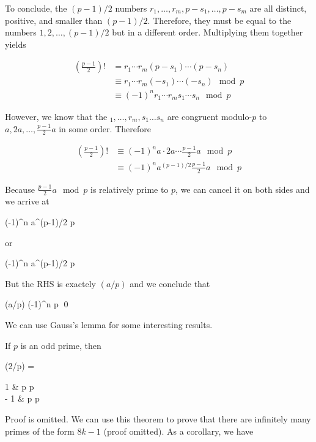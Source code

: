 To conclude, the $(p-1)/2$ numbers $r_1, \ldots, r_m, p - s_1, \ldots, p - s_m$ are all distinct, positive, and smaller than $(p-1)/2$. Therefore, they must be equal to the numbers $1, 2, \ldots, (p-1)/2$ but in a different order. Multiplying them together yields

\begin{align*}
\left( \frac{p-1}{2} \right) ! &= r_1 \cdots r_m (p-s_1)\cdots (p-s_n) \\
&\equiv r_1 \cdots r_m (-s_1)\cdots (-s_n) \mod p \\
&\equiv(-1)^n r_1 \cdots r_m s_1\cdots s_n \mod p
\end{align*}

However, we know that the $_1, \ldots, r_m, s_1\ldots s_n$ are congruent modulo-$p$ to $a, 2a, \ldots, \frac{p-1}{2}a$  in some order. Therefore 

\begin{align*}
\left( \frac{p-1}{2} \right) ! &\equiv (-1)^n a \cdot 2a \cdots \frac{p-1}{2}a \mod p \\
&\equiv (-1)^n a^{(p-1)/2} \frac{p-1}{2}a \mod p
\end{align*}

Because $\frac{p-1}{2}a \mod p$ is relatively prime to $p$, we can cancel it on both sides and we arrive at

 \equiv (-1)^n a^{(p-1)/2}  \mod p \\
\eee

or

\bee
(-1)^n  \equiv a^{(p-1)/2}  \mod p \\
\eee

But the RHS is exactely $(a/p)$ and we conclude that

\bee
(a/p) \equiv (-1)^n \mod p \qed
\eee

We can use Gauss's lemma for some interesting results.

\begin{theorem}
	If $p$ is an odd prime, then

	\bee
		(2/p) = \begin{cases}
			1 &  p    p   \\
			- 1 &  p    p  
		\end{cases}
	\eee
\end{theorem}

Proof is omitted. We can use this theorem to prove that there are infinitely many primes of the form $8k-1$ (proof omitted). As a corollary, we have

